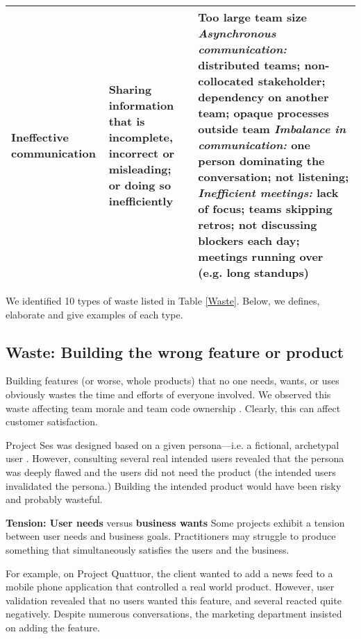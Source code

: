 \begin{table*}[t]
\begin{tabular}{|p{1.7in}|p{2.2in}|p{3in}|}
Ineffective communication             & Sharing information that is incomplete, incorrect or misleading; or doing so inefficiently                          & Too large team size \newline \textit{Asynchronous communication:} distributed teams; non-collocated stakeholder; dependency on another team; opaque processes outside team \newline \textit{Imbalance in communication:} one person dominating the conversation; not listening; \newline \textit{Inefficient meetings:} lack of focus; teams skipping retros; not discussing blockers each day; meetings running over (e.g. long standups) \\ \hline                  
\end{tabular}
\end{table*}

We identified 10 types of waste listed in Table \ref{Waste}. Below, we defines, elaborate and give examples of each type. 
\subsection{Waste: Building the wrong feature or product}
Building features (or worse, whole products) that no one needs, wants, or uses obviously wastes the time and efforts of everyone involved. We observed this waste affecting team morale and team code ownership \cite{SedanoTeamCodeOwnership}. Clearly, this can affect customer satisfaction. 

Project Ses was designed based on a given persona—i.e. a fictional, archetypal user \cite{Grudin2002personas}. However, consulting several real intended users revealed that the persona was deeply flawed and the users did not need the product (the intended users invalidated the persona.) Building the intended product would have been risky and probably wasteful. 

\textbf{Tension: User needs} versus \textbf{business wants}
Some projects exhibit a tension between user needs and business goals. Practitioners may struggle to produce something that simultaneously satisfies the users and the business.

For example, on Project Quattuor, the client wanted to add a news feed to a mobile phone application that controlled a real world product. However, user validation revealed that no users wanted this feature, and several reacted quite negatively. Despite numerous conversations, the marketing department insisted on adding the feature. 
